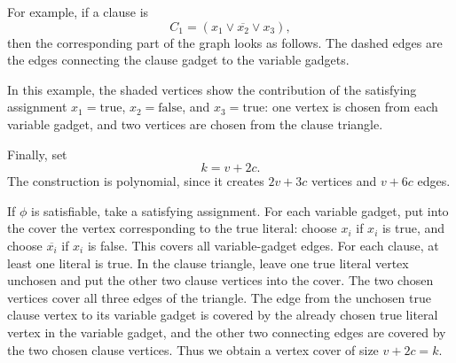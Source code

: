 \documentclass[a4paper, UTF-8]{article}
\theoremstyle{plain}
\begin{document}
For example, if a clause is
\[
C_1=(x_1\vee \overline{x_2}\vee x_3),
\]
then the corresponding part of the graph looks as follows. The dashed edges are
the edges connecting the clause gadget to the variable gadgets.

\begin{center}
\end{center}

In this example, the shaded vertices show the contribution of the satisfying
assignment $x_1=\text{true}$, $x_2=\text{false}$, and $x_3=\text{true}$: one
vertex is chosen from each variable gadget, and two vertices are chosen from the
clause triangle.

Finally, set
\[
k=v+2c.
\]
The construction is polynomial, since it creates $2v+3c$ vertices and
$v+6c$ edges.

If $\phi$ is satisfiable, take a satisfying assignment. For each variable gadget,
put into the cover the vertex corresponding to the true literal: choose $x_i$ if
$x_i$ is true, and choose $\overline{x_i}$ if $x_i$ is false. This covers all
variable-gadget edges. For each clause, at least one literal is true. In the
clause triangle, leave one true literal vertex unchosen and put the other two
clause vertices into the cover. The two chosen vertices cover all three edges of
the triangle. The edge from the unchosen true clause vertex to its variable
gadget is covered by the already chosen true literal vertex in the variable
gadget, and the other two connecting edges are covered by the two chosen clause
vertices. Thus we obtain a vertex cover of size $v+2c=k$.
\end{document}
